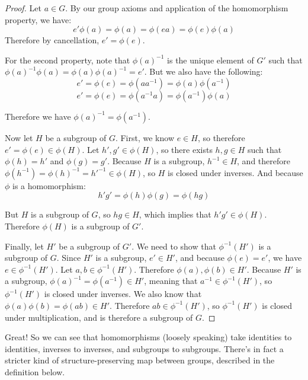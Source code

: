 \documentclass[12pt]{article}
\newcommand{\inv}[1]{#1^{-1}}
\theoremstyle{definition}
\theoremstyle{definition}
\theoremstyle{definition}
\theoremstyle{definition}
\begin{document}
\begin{proof}
Let $a \in G$. By our group axioms and application of the homomorphism property, we have:
\begin{equation*}
    e'\phi(a) = \phi(a) = \phi(ea) = \phi(e)\phi(a)
\end{equation*}
Therefore by cancellation, $e' = \phi(e)$.

For the second property, note that $\inv{\phi(a)}$ is the unique element of $G'$ such that $\inv{\phi(a)}\phi(a) = \phi(a)\inv{\phi(a)} = e'$. But we also have the following:
\begin{equation*}
    e' = \phi(e) = \phi(a\inv{a}) = \phi(a)\phi(\inv a)
\end{equation*}
\begin{equation*}
    e' = \phi(e) = \phi(\inv a a) = \phi(\inv a)\phi(a)
\end{equation*}

Therefore we have $\inv{\phi(a)} = \phi(\inv a)$.

Now let $H$ be a subgroup of $G$. First, we know $e \in H$, so therefore $e' = \phi(e) \in \phi(H)$. Let $h', g' \in \phi(H)$, so there exists $h, g \in H$ such that $\phi(h) = h'$ and $\phi(g) = g'$. Because $H$ is a subgroup, $\inv h \in H$, and therefore $\phi(\inv h) = \inv{\phi(h)} = \inv{h'} \in \phi(H)$, so $H$ is closed under inverses. And because $\phi$ is a homomorphism:
\begin{equation*}
    h'g' = \phi(h)\phi(g) = \phi(hg)
\end{equation*}

But $H$ is a subgroup of $G$, so $hg \in H$, which implies that $h'g' \in \phi(H)$. Therefore $\phi(H)$ is a subgroup of $G'$.

Finally, let $H'$ be a subgroup of $G'$. We need to show that $\inv \phi (H')$ is a subgroup of $G$. Since $H'$ is a subgroup, $e' \in H'$, and because $\phi(e) = e'$, we have $e \in \inv \phi(H')$. Let $a, b \in \inv \phi(H')$. Therefore $\phi(a), \phi(b) \in H'$. Because $H'$ is a subgroup, $\inv{\phi(a)} = \phi(\inv a) \in H'$, meaning that $\inv a \in \inv\phi(H')$, so $\inv\phi(H')$ is closed under inverses. We also know that $\phi(a)\phi(b) = \phi(ab) \in H'$. Therefore $ab \in \inv\phi(H')$, so $\inv\phi(H')$ is closed under multiplication, and is therefore a subgroup of $G$.

\end{proof}

Great! So we can see that homomorphisms (loosely speaking) take identities to identities, inverses to inverses, and subgroups to subgroups. There's in fact a stricter kind of structure-preserving map between groups, described in the definition below.
\end{document}
